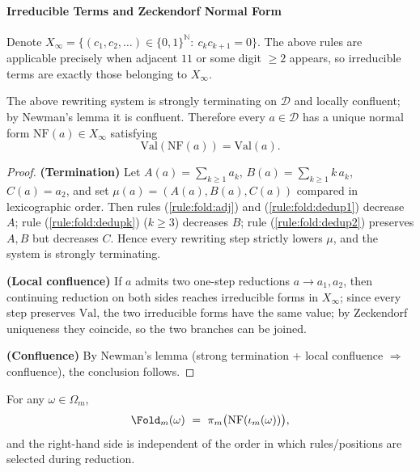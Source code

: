 \paragraph{Irreducible Terms and Zeckendorf Normal Form}
Denote $X_\infty=\{(c_1,c_2,\dots)\in\{0,1\}^{\mathbb{N}}:\ c_kc_{k+1}=0\}$. The above rules are applicable precisely when adjacent $11$ or some digit $\ge 2$ appears, so irreducible terms are exactly those belonging to $X_\infty$.

\begin{proposition}\label{prop:fold-rewrite-newman}
The above rewriting system is strongly terminating on $\mathcal{D}$ and locally confluent; by Newman's lemma it is confluent. Therefore every $a\in\mathcal{D}$ has a unique normal form $\mathrm{NF}(a)\in X_\infty$ satisfying
\[
\mathrm{Val}(\mathrm{NF}(a))=\mathrm{Val}(a).
\]
\end{proposition}

\begin{proof}
\textbf{(Termination)} Let $A(a)=\sum_{k\ge 1} a_k$, $B(a)=\sum_{k\ge 1} k\,a_k$, $C(a)=a_2$, and set $\mu(a)=(A(a),B(a),C(a))$ compared in lexicographic order. Then rules (\ref{rule:fold:adj}) and (\ref{rule:fold:dedup1}) decrease $A$; rule (\ref{rule:fold:dedupk}) ($k\ge 3$) decreases $B$; rule (\ref{rule:fold:dedup2}) preserves $A,B$ but decreases $C$. Hence every rewriting step strictly lowers $\mu$, and the system is strongly terminating.

\textbf{(Local confluence)} If $a$ admits two one-step reductions $a\to a_1,a_2$, then continuing reduction on both sides reaches irreducible forms in $X_\infty$; since every step preserves $\mathrm{Val}$, the two irreducible forms have the same value; by Zeckendorf uniqueness they coincide, so the two branches can be joined.

\textbf{(Confluence)} By Newman's lemma (strong termination + local confluence $\Rightarrow$ confluence), the conclusion follows.
\end{proof}

\begin{corollary}\label{cor:foldm-order-indep}
For any $\omega\in\Omega_m$,
\[
\Fold_m(\omega)\ =\ \pi_m\bigl(\mathrm{NF}(\iota_m(\omega))\bigr),
\]
and the right-hand side is independent of the order in which rules/positions are selected during reduction.
\end{corollary}


